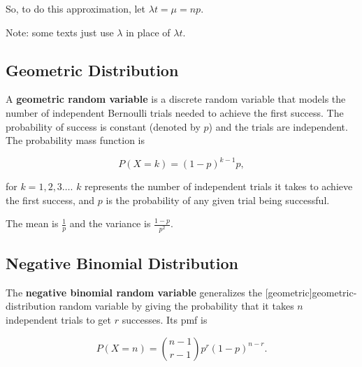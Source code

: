 \documentclass{article}
\begin{document}
So, to do this approximation, let $\lambda t = \mu = np.$

Note: some texts just use $\lambda$ in place of $\lambda t.$

\subsection{Geometric Distribution}

\begin{definition}
A \textbf{geometric random variable} is a \@{discrete random variable} that models the number of \@{independent} Bernoulli trials needed to achieve the first success. The \@{probability} of success is constant (denoted by $p$) and the trials are independent. The \@{probability mass function} is

\[ P(X = k) = (1 - p)^{k-1} p, \]

for $k = 1, 2, 3 \dots.$ $k$ represents the number of independent trials it takes to achieve the first success, and $p$ is the probability of any given trial being successful.

The mean is $\frac{1}{p}$ and the \@{variance} is $\frac{1 - p}{p^2}.$
\end{definition}

\subsection{Negative Binomial Distribution}

\begin{definition}
The \textbf{negative binomial random variable} generalizes the \@[geometric]{geometric-distribution} \@{random variable} by giving the \@{probability} that it takes $n$ \@{independent} trials to get $r$ successes. Its pmf is

\[ P(X = n) = \binom{n - 1}{r - 1} p^r (1 - p)^{n - r}. \]
\end{definition}
\end{document}
